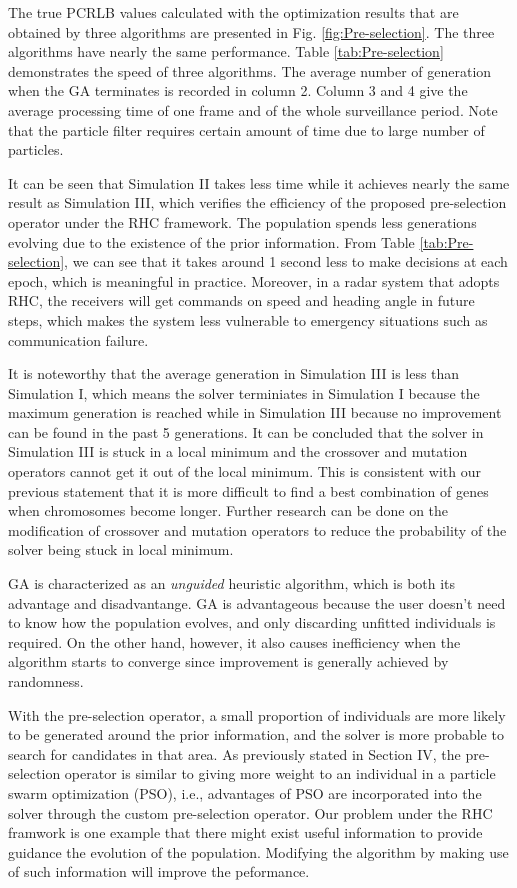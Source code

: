 \documentclass[12pt,journal,draftclsnofoot,onecolumn]{IEEEtran}
\begin{document}
The true PCRLB values calculated with the optimization results that are obtained by three algorithms are presented in Fig. \ref{fig:Pre-selection}. The three algorithms have nearly the same performance. Table \ref{tab:Pre-selection} demonstrates the speed of three algorithms. The average number of generation when the GA terminates is recorded in column 2. Column 3 and 4 give the average processing time of one frame and of the whole surveillance period. Note that the particle filter requires certain amount of time due to large number of particles.

It can be seen that Simulation II takes less time while it achieves nearly the same result as Simulation III, which verifies the efficiency of the proposed pre-selection operator under the RHC framework. The population spends less generations evolving due to the existence of the prior information. From Table \ref{tab:Pre-selection}, we can see that it takes around 1 second less to make decisions at each epoch, which is meaningful in practice. Moreover, in a radar system that adopts RHC, the receivers will get commands on speed and heading angle in future steps, which makes the system less vulnerable to emergency situations such as communication failure.

It is noteworthy that the average generation in Simulation III is less than Simulation I, which means the solver terminiates in Simulation I because the maximum generation is reached while in Simulation III because no improvement can be found in the past 5 generations. It can be concluded that the solver in Simulation III is stuck in a local minimum and the crossover and mutation operators cannot get it out of the local minimum. This is consistent with our previous statement that it is more difficult to find a best combination of genes when chromosomes become longer. Further research can be done on the modification of crossover and mutation operators to reduce the probability of the solver being stuck in local minimum. 

GA is characterized as an \emph{unguided} heuristic algorithm, which is both its advantage and disadvantange. GA is advantageous because the user doesn't need to know how the population evolves, and only discarding unfitted individuals is required. On the other hand, however, it also causes inefficiency when the algorithm starts to converge since improvement is generally achieved by randomness. 

With the pre-selection operator, a small proportion of individuals are more likely to be generated around the prior information, and the solver is more probable to search for candidates in that area. As previously stated in Section IV, the pre-selection operator is similar to giving more weight to an individual in a particle swarm optimization (PSO), i.e., advantages of PSO are incorporated into the solver through the custom pre-selection operator. Our problem under the RHC framwork is one example that there might exist useful information to provide guidance the evolution of the population. Modifying the algorithm by making use of such information will improve the peformance.
\end{document}

